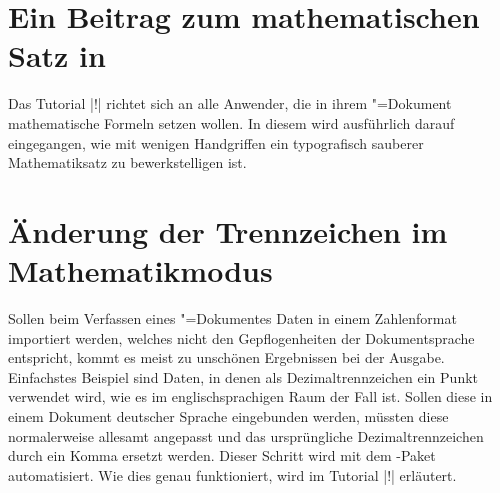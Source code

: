 \section{Ein Beitrag zum mathematischen Satz in }
\label{sec:exmpl:mathtype}%
%
%
Das Tutorial |!| richtet sich an alle Anwender, die in ihrem 
"=Dokument mathematische Formeln setzen wollen. In diesem wird 
ausführlich darauf eingegangen, wie mit wenigen Handgriffen ein typografisch 
sauberer Mathematiksatz zu bewerkstelligen ist.

\section{Änderung der Trennzeichen im Mathematikmodus}
\label{sec:exmpl:mathswap}
%
%
%
Sollen beim Verfassen eines "=Dokumentes Daten in einem 
Zahlenformat importiert werden, welches nicht den Gepflogenheiten der 
Dokumentsprache entspricht, kommt es meist zu unschönen Ergebnissen bei der 
Ausgabe. Einfachstes Beispiel sind Daten, in denen als Dezimaltrennzeichen ein 
Punkt verwendet wird, wie es im englischsprachigen Raum der Fall ist. Sollen 
diese in einem Dokument deutscher Sprache eingebunden werden, müssten diese 
normalerweise allesamt angepasst und das ursprüngliche Dezimaltrennzeichen 
durch ein Komma ersetzt werden. Dieser Schritt wird mit dem \TUDScript-Paket 
 automatisiert. Wie dies genau funktioniert, wird im Tutorial 
|!| erläutert.
%

